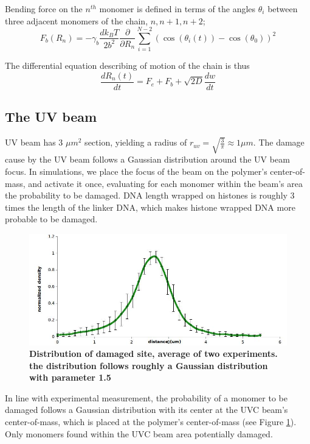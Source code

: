 \documentclass[12pt]{report}
\begin{document}
		Bending force on the $n^{th}$ monomer is defined in terms of the angles $\theta_i$ between three adjacent monomers of the chain, $n,n+1,n+2$;
		\begin{equation*}
		F_b(R_n) = -\gamma_b\frac{dk_BT}{2b^2}\frac{\partial}{\partial R_n}\sum_{i=1}^{N-2}(\cos(\theta_i(t))-\cos(\theta_0))^2
		\end{equation*}
		
		The differential equation describing of motion of the chain is thus 
		\begin{equation*}
		\frac{dR_n(t)}{dt}= F_e +F_b +\sqrt{2D} \frac{dw}{dt}     
		\end{equation*}
					
	\subsection{The UV beam}\label{subsection:TheUVbeam}
	UV beam has 3 $\mu m^2$ section, yielding a radius of $r_{uv}=\sqrt{\frac{3}{\pi}}\approx 1 \mu m$. 
    The damage cause by the UV beam follows a Gaussian distribution around the UV beam focus. In simulations, we place the focus of the beam on the polymer's center-of-mass, and activate it once, evaluating for each monomer within the beam's area the probability to be damaged. DNA length wrapped on histones is roughly 3 times the length of the linker DNA, which makes histone wrapped DNA more probable to be damaged. 
    
	\begin{figure}[H]
	\centering
	\includegraphics[width=0.45\linewidth, height=0.2\textheight]{UVDamageDistribution}
	\caption{\tiny{\textbf{Distribution of damaged site, average of two experiments. the distribution follows roughly a Gaussian distribution with parameter 1.5}}}
	\label{fig:UVDamageDistribution}
	\end{figure}
	
    In line with experimental measurement, the probability of a monomer to be damaged follows a Gaussian distribution with its center at the UVC beam's center-of-mass, which is placed at the polymer's center-of-mass (see Figure \ref{fig:UVDamageDistribution}). Only monomers found within the UVC beam area potentially damaged. 
      	
\end{document}
